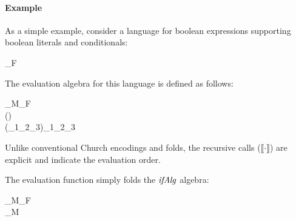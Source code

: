 \paragraph{Example} As a simple example, consider a language
for boolean expressions supporting boolean literals and
conditionals:
\begin{hscode}\SaveRestoreHook
{}%
%
%
\>[3]{}\;_F\;\mathrel{=}\;\mid {}\;\;\;\<[E]%
\ColumnHook
\end{hscode}\resethooks
\begin{hscode}\SaveRestoreHook
{}%
%
%
\>[3]{}\;\mathrel{=}\<[E]%
\ColumnHook
\end{hscode}\resethooks
The evaluation algebra for this language is defined as follows:
\begin{hscode}\SaveRestoreHook
{}%
%
%
%
\>[3]{}\mathbin{::}_M\;_F\;\<[E]%
\\
\>[3]{}\;\llbracket \cdot \rrbracket\;(\;){}\<[29]%
\>[29]{}\mathrel{=}\<[E]%
\\
\>[3]{}\;\llbracket \cdot \rrbracket\;(\;_1\;_2\;_3){}\<[29]%
\>[29]{}\mathrel{=}\;\llbracket {}_1\rrbracket\;\;\llbracket {}_2\rrbracket\;\;\llbracket {}_3\rrbracket{}\<[E]%
\ColumnHook
\end{hscode}\resethooks
Unlike conventional Church encodings and folds, the recursive calls (\ensuremath{\llbracket \cdot \rrbracket})
are explicit and indicate the evaluation order.


\noindent The evaluation function simply folds the \ensuremath{\Varid{ifAlg}} algebra:

\begin{hscode}\SaveRestoreHook
{}%
%
%
\>[3]{}\mathbin{::}_M\;_F\to {}\<[E]%
\\
\>[3]{}\mathrel{=}_M\;\<[E]%
\ColumnHook
\end{hscode}\resethooks

